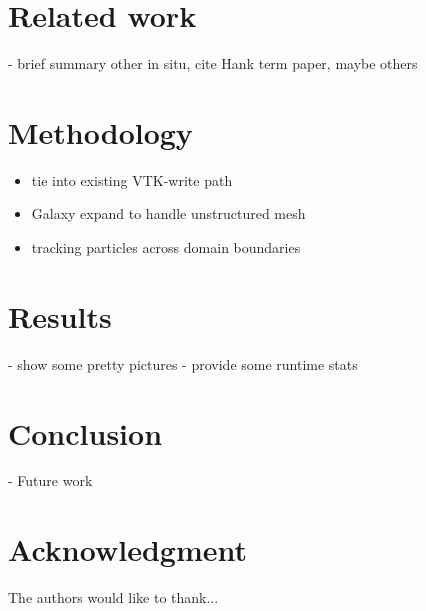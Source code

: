 \documentclass[journal]{IEEEtran}
\begin{document}
\section{Related work}
  - brief summary other in situ, cite Hank term paper, maybe others

\section{Methodology}
\begin{itemize}
  \item tie into existing VTK-write path
  \item Galaxy expand to handle unstructured mesh
  \item tracking particles across domain boundaries
\end{itemize}
  
\section{Results}
  - show some pretty pictures
  - provide some runtime stats

\section{Conclusion}
- Future work

\appendices

\section*{Acknowledgment}
The authors would like to thank...


\ifCLASSOPTIONcaptionsoff
  \newpage
\fi





%
%
\end{document}
